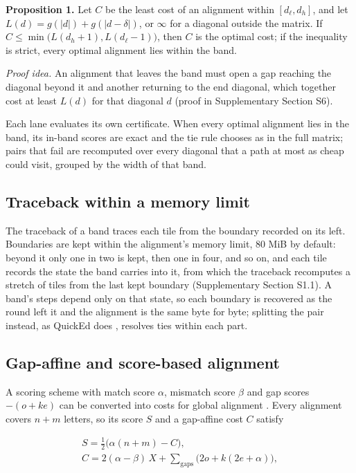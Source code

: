\textbf{Proposition 1.} Let \(C\) be the least cost of an alignment within \([d_\ell, d_h]\), and let \(L(d) = g(|d|) + g(|d-\delta|)\), or \(\infty\) for a diagonal outside the matrix. If \(C \le \min\bigl(L(d_h+1), L(d_\ell-1)\bigr)\), then \(C\) is the optimal cost; if the inequality is strict, every optimal alignment lies within the band.

\emph{Proof idea.} An alignment that leaves the band must open a gap reaching the diagonal beyond it and another returning to the end diagonal, which together cost at least \(L(d)\) for that diagonal \(d\) (proof in Supplementary Section S6).

Each lane evaluates its own certificate. When every optimal alignment lies in the band, its in-band scores are exact and the tie rule chooses as in the full matrix; pairs that fail are recomputed over every diagonal that a path at most as cheap could visit, grouped by the width of that band.

\subsection{Traceback within a memory limit}

The traceback of a band traces each tile from the boundary recorded on its left. Boundaries are kept within the alignment's memory limit, 80 MiB by default: beyond it only one in two is kept, then one in four, and so on, and each tile records the state the band carries into it, from which the traceback recomputes a stretch of tiles from the last kept boundary (Supplementary Section S1.1). A band's steps depend only on that state, so each boundary is recovered as the round left it and the alignment is the same byte for byte; splitting the pair instead, as QuickEd does \citep{Doblas2025quicked}, resolves ties within each part.

\subsection{Gap-affine and score-based alignment}

A scoring scheme with match score \(\alpha\), mismatch score \(\beta\) and gap scores \(-(o+ke)\) can be converted into costs for global alignment \citep{Eizenga2022wfalm}. Every alignment covers \(n+m\) letters, so its score \(S\) and a gap-affine cost \(C\) satisfy

\begin{equation}\begin{gathered}
S = \tfrac12\bigl(\alpha(n+m) - C\bigr),\\ C = 2(\alpha-\beta)\,X + \sum_{\text{gaps}} \bigl(2o + k(2e+\alpha)\bigr),
\end{gathered}\end{equation}

